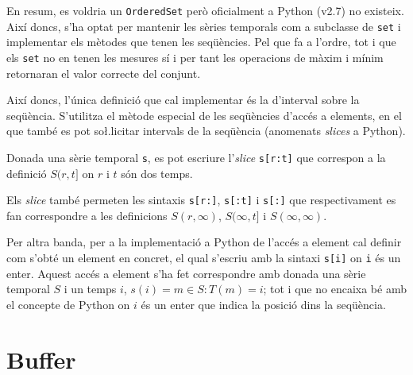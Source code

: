 En resum, es voldria un \verb+OrderedSet+ però oficialment a Python (v2.7) no existeix. Així doncs, s'ha optat per mantenir les sèries temporals com a subclasse de \verb+set+ i implementar els mètodes que tenen les seqüències. Pel que fa a l'ordre, tot i que els \verb+set+ no en tenen les mesures sí i per tant les operacions de màxim i mínim retornaran el valor correcte del conjunt.

Així doncs, l'única definició que cal implementar és la d'interval sobre la seqüència. S'utilitza el mètode especial de les seqüències d'accés a elements, en el que també es pot so\l.licitar intervals de la seqüència (anomenats \emph{slices} a Python).

Donada una sèrie temporal \verb+s+, es pot escriure l'\emph{slice} \verb+s[r:t]+ que correspon a la definició $S(r,t]$ on $r$ i $t$ són dos temps. 

Els \emph{slice} també permeten les sintaxis \verb+s[r:]+, \verb+s[:t]+ i \verb+s[:]+  que respectivament es fan correspondre a les definicions $S(r,\infty)$, $S(\infty,t]$ i $S(\infty,\infty)$.


Per altra banda, per a la implementació a Python de l'accés a element cal definir com s'obté un element en concret, el qual s'escriu amb la sintaxi \verb+s[i]+ on \verb+i+ és un enter. Aquest accés a element s'ha fet correspondre amb donada una sèrie temporal $S$ i un temps $i$, $s(i) = m \in S : T(m) = i$; tot i que no encaixa bé amb el concepte de Python on $i$ és un enter que indica la posició dins la seqüència. 

  


\section{Buffer}

